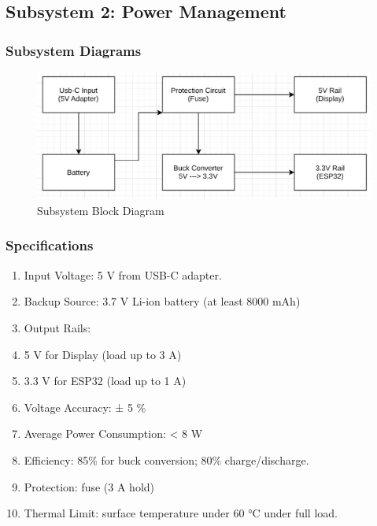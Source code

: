 \clearpage
\subsection{Subsystem 2: Power Management}

\subsubsection{Subsystem Diagrams}
\begin{figure}[h]
    \centering
    \includegraphics[width=16cm]{images/Power/BlockDiagram-power.jpg} %
    \caption{Subsystem Block Diagram}
\end{figure} %

\subsubsection{Specifications}
\begin{enumerate}
    \item {Input Voltage: 5 V from USB-C adapter.}
    \item {Backup Source: 3.7 V Li-ion battery (at least 8000 mAh)}
    \item {Output Rails:}
    \item {5 V for Display (load up to 3 A)}
    \item {3.3 V for ESP32 (load up to 1 A)}
    \item {Voltage Accuracy: ± 5 \%}
    \item {Average Power Consumption: < 8 W}
    \item {Efficiency: 85\% for buck conversion; 80\% charge/discharge.}
    \item {Protection: fuse (3 A hold)}
    \item {Thermal Limit: surface temperature under 60 °C under full load.}
\end{enumerate}

